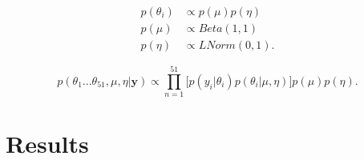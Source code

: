 \documentclass[paper=letter, fontsize=12pt]{scrartcl} %
\numberwithin{equation}{section} %
\numberwithin{figure}{section} %
\numberwithin{table}{section} %
\begin{document}
	\begin{align*}
	p(\theta_i) & \propto p(\mu)p(\eta) \\
	p(\mu) & \propto Beta(1,1) \\
	p(\eta) & \propto LNorm(0,1).
	\end{align*}



\begin{equation*}
p(\theta_1...\theta_{51},\mu,\eta|\mathbf{y}) \propto \prod_{n=1}^{51}\Big[p(y_i|\theta_i)p(\theta_i|\mu,\eta)\Big] p(\mu)p(\eta).
\end{equation*}


\section{Results}














\end{document}
